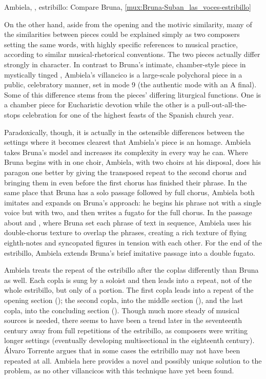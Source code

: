 {Ambiela, , estribillo: Compare Bruna,
\cref{mux:Bruna-Suban_las_voces-estribillo}}

On the other hand, aside from the opening and the motivic similarity, many of
the similarities between pieces could be explained simply as two composers
setting the same words, with highly specific references to musical practice,
according to similar musical-rhetorical conventions.
The two pieces actually differ strongly in character.
In contrast to Bruna's intimate, chamber-style piece in mystically tinged
, Ambiela's villancico is a large-scale polychoral piece in
a public, celebratory manner, set in mode 9 (the authentic mode with an A
final).
Some of this difference stems from the pieces' differing liturgical functions. 
One is a chamber piece for Eucharistic devotion while the other is a
pull-out-all-the-stops celebration for one of the highest feasts of the Spanish
church year.

Paradoxically, though, it is actually in the ostensible differences between the
settings where it becomes clearest that Ambiela's piece is an homage.
Ambiela takes Bruna's model and increases its complexity in every way he can.
Where Bruna begins with  in one choir, Ambiela, with two choirs
at his disposal, does his paragon one better by giving the transposed repeat to
the second chorus and bringing them in even before the first chorus has
finished their phrase.
In the same place that Bruna has a solo passage followed by full chorus,
Ambiela both imitates and expands on Bruna's approach: he begins his phrase not
with a single voice but with two, and then writes a fugato for the full chorus.
In the passage about  and , where Bruna set
each phrase of text in sequence, Ambiela uses his double-chorus texture to
overlap the phrases, creating a rich texture of flying eighth-notes and
syncopated figures in tension with each other.
For the end of the estribillo, Ambiela extends Bruna's brief imitative passage
into a double fugato.

Ambiela treats the repeat of the estribillo after the coplas differently than
Bruna as well.
Each copla is sung by a soloist and then leads into a repeat, not of the whole
estribillo, but only of a portion.
The first copla leads into a repeat of the
opening section (); the second copla, into the middle section
(), and the last copla, into the concluding section
().
Though much more steady of musical sources is needed, there seems to have been
a trend later in the seventeenth century away from full repetitions of the
estribillo, as composers were writing longer settings (eventually developing
multisectional  in the eighteenth century).
Álvaro Torrente argues that in some cases the estribillo may not have been
repeated at all.%
Ambiela here provides a novel and possibly unique solution to the problem, as
no other villancicos with this technique have yet been found.


